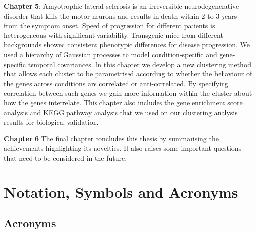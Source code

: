 \textbf{Chapter 5}:
Amyotrophic lateral sclerosis is an irreversible neurodegenerative disorder that kills the motor neurons and results in death within 2 to 3 years from the symptom onset.  Speed of progression for different patients is heterogeneous with significant variability. Transgenic mice from different backgrounds showed consistent phenotypic differences for disease progression. We used a hierarchy of Gaussian processes to model condition-specific and gene-specific temporal covariances. In this chapter we develop a new clustering method that allows each cluster to be parametrised according to whether the behaviour of the genes across conditions are correlated or anti-correlated. By specifying correlation between such genes we gain more information within the cluster about how the genes interrelate. This chapter also includes the gene enrichment score analysis and KEGG pathway analysis that we used on our clustering analysis results for biological validation.

\textbf{Chapter 6}
The final chapter concludes this thesis by summarising the achievements highlighting its novelties. It also raises some important questions that need to be considered in the future.

\section{Notation, Symbols and Acronyms}

\subsection{Acronyms}

